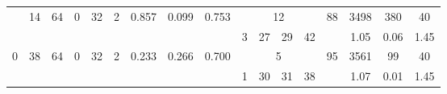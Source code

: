 \begin{landscape}
\begin{savenotes}
\begin{longtable}{ccccccccccccccccc}
\endhead


\endfoot
    \bottomrule
\endlastfoot

\multirow{2}{*}{2} &
 \multirow{2}{*}{14} & \multirow{2}{*}{64} & \multirow{2}{*}{0} & \multirow{2}{*}{32} & \multirow{2}{*}{2} & \multirow{2}{*}{0.857} & \multirow{2}{*}{0.099} & \multirow{2}{*}{0.753} & \multicolumn{4}{c}{12} & \multirow{2}{*}{88} & 3498 & 380 & 40 \\
\cmidrule{10-13}
 & &  &  &  &  &  &  &  & 3 & 27 & 29 & 42 &  & 1.05 & 0.06 & 1.45 \\




 \midrule  \midrule



\multirow{2}{*}{0} &
 \multirow{2}{*}{38} & \multirow{2}{*}{64} & \multirow{2}{*}{0} & \multirow{2}{*}{32} & \multirow{2}{*}{2} & \multirow{2}{*}{0.233} & \multirow{2}{*}{0.266} & \multirow{2}{*}{0.700} & \multicolumn{4}{c}{5} & \multirow{2}{*}{95} & 3561 & 99 & 40 \\
\cmidrule{10-13}
 & &  &  &  &  &  &  &  & 1 & 30 & 31 & 38 &  & 1.07 & 0.01 & 1.45 \\










\end{longtable}
\end{savenotes}




\end{landscape}
\restoregeometry
